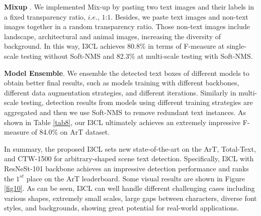 \textbf{Mixup} \citep{mixup}. We implemented Mix-up by pasting two text images and their labels in a fixed transparency ratio, $i.e.$, $1$:$1$. Besides, we paste text images and non-text images together in a random transparency ratio. Those non-text images include landscape, architectural and animal images, increasing the diversity of background. In this way, I3CL achieves 80.8\% in terms of F-measure at single-scale testing without Soft-NMS and 82.3\% at multi-scale testing with Soft-NMS.

\textbf{Model Ensemble}. We ensemble the detected text boxes of different models to obtain better final results, such as models training with different backbones, different data augmentation strategies, and different iterations. Similarly in multi-scale testing, detection results from models using different training strategies are aggregated and then we use Soft-NMS to remove redundant text instances. As shown in Table \ref{tab8}, our I3CL ultimately achieves an extremely impressive F-measure of 84.0\% on ArT dataset.

In summary, the proposed I3CL sets new state-of-the-art on the ArT, Total-Text, and CTW-1500 for arbitrary-shaped scene text detection. Specifically, I3CL with ResNeSt-101 backbone achieves an impressive detection performance and ranks the $1^{st}$ place on the ArT leaderboard. Some visual results are shown in Figure \ref{fig10}. As can be seen, I3CL can well handle different challenging cases including various shapes, extremely small scales, large gaps between characters, diverse font styles, and backgrounds, showing great potential for real-world applications.


\begin{table}[ht]\scriptsize
  \caption{Results of I3CL without SSL using different backbones on ArT dataset. $\dag$ and $\ddag$ represent the RegionCL~\citep{regioncl} with finetuning and without finetuning on the ImageNet training data, respectively. * indicates that the whole detection model is implemented in MMDetection \citep{mmdetection}. }
  \label{tab9}
  \begin{center}
\end{center}
\end{table}

